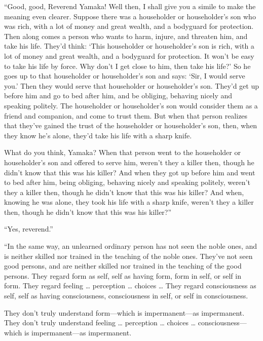 \documentclass[12pt,openany]{book}%
\begin{document}
“Good, good, Reverend Yamaka! Well then, I shall give you a simile to make the meaning even clearer. Suppose there was a householder or householder’s son who was rich, with a lot of money and great wealth, and a bodyguard for protection. Then along comes a person who wants to harm, injure, and threaten him, and take his life. They’d think: ‘This householder or householder’s son is rich, with a lot of money and great wealth, and a bodyguard for protection. It won’t be easy to take his life by force. Why don’t I get close to him, then take his life?’ So he goes up to that householder or householder’s son and says: ‘Sir, I would serve you.’ Then they would serve that householder or householder’s son. They’d get up before him and go to bed after him, and be obliging, behaving nicely and speaking politely. The householder or householder’s son would consider them as a friend and companion, and come to trust them. But when that person realizes that they’ve gained the trust of the householder or householder’s son, then, when they know he’s alone, they’d take his life with a sharp knife. 

What do you think, Yamaka? When that person went to the householder or householder’s son and offered to serve him, weren’t they a killer then, though he didn’t know that this was his killer? And when they got up before him and went to bed after him, being obliging, behaving nicely and speaking politely, weren’t they a killer then, though he didn’t know that this was his killer? And when, knowing he was alone, they took his life with a sharp knife, weren’t they a killer then, though he didn’t know that this was his killer?” 

“Yes, reverend.” 

“In the same way, an unlearned ordinary person has not seen the noble ones, and is neither skilled nor trained in the teaching of the noble ones. They’ve not seen good persons, and are neither skilled nor trained in the teaching of the good persons. They regard form as self, self as having form, form in self, or self in form. They regard feeling … perception … choices … They regard consciousness as self, self as having consciousness, consciousness in self, or self in consciousness. 

They don’t truly understand form—which is impermanent—as impermanent. They don’t truly understand feeling … perception … choices … consciousness—which is impermanent—as impermanent. 
\end{document}
